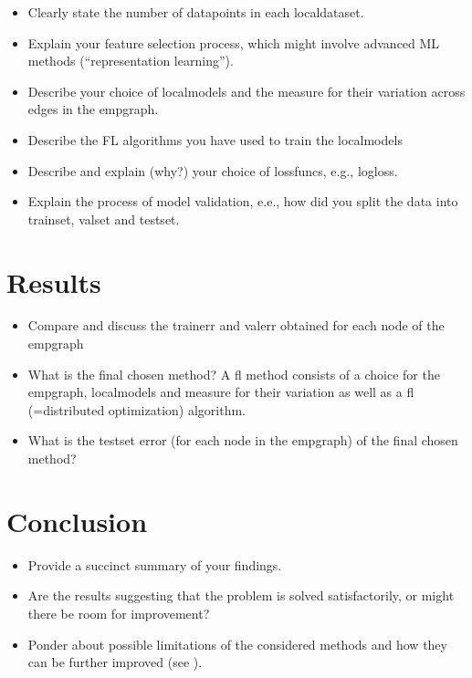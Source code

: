\documentclass{article}
\begin{document}
\begin{itemize} 
\item Clearly state the number of \gls{datapoint}s in each \gls{localdataset}. 
\item Explain your \gls{feature} selection process, which might involve advanced 
ML methods (``representation learning''). 
\item Describe your choice of \gls{localmodel}s and the measure for their variation across edges 
in the \gls{empgraph}. 
\item Describe the FL algorithms you have used to train the \gls{localmodel}s \cite[Sec. 9]{lecnotesfl}
\item Describe and explain (why?) your choice of \gls{lossfunc}s, e.g., \gls{logloss}.
\item Explain the process of model \gls{validation}, e.e., how did you split the data into \gls{trainset}, \gls{valset} and \gls{testset}. 
\end{itemize} 

\section{Results} 
\label{sec_results} 

\begin{itemize} 
	\item Compare and discuss the \gls{trainerr} and \gls{valerr} obtained for each node of the \gls{empgraph}
	\item What is the final chosen method? A \gls{fl} method consists of a choice for the \gls{empgraph}, 
	\gls{localmodel}s and measure for their variation as well as a \gls{fl} (=distributed optimization) algorithm. 
	\item What is the \gls{testset} error (for each node in the \gls{empgraph}) of the final chosen method?
\end{itemize} 

\section{Conclusion}

\begin{itemize} 
\item Provide a succinct summary of your findings.
\item Are the results suggesting that the problem is solved satisfactorily, or might
there be room for improvement?
\item Ponder about possible limitations of the considered methods and how they  
can be further improved (see \cite[Sec. 6.6.]{MLBasics}).
\end{itemize} 



\newpage




\end{document}

